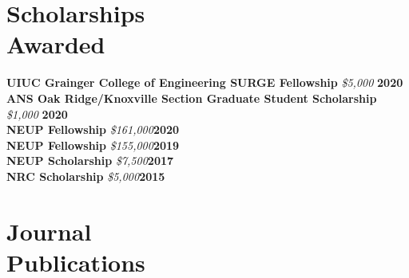 \documentclass[margin,line]{resume}
\begin{document}
\begin{resume}
    \section{\mysidestyle Scholarships\\Awarded}
    \textbf{UIUC Grainger College of Engineering SURGE Fellowship} \textsl{\$5,000} \hfill \textbf{2020}\\
    \textbf{ANS Oak Ridge/Knoxville Section Graduate Student Scholarship} \textsl{\$1,000} \hfill \textbf{2020}\\
    \textbf{NEUP Fellowship} \textsl{\$161,000}\hfill \textbf{2020}\\
    \textbf{NEUP Fellowship} \textsl{\$155,000}\hfill \textbf{2019}\\
    \textbf{NEUP Scholarship} \textsl{\$7,500}\hfill \textbf{2017}\\
    \textbf{NRC Scholarship} \textsl{\$5,000}\hfill \textbf{2015}\\

    \section{\mysidestyle Journal\\Publications}
      \begin{bibenum}
      \item {}
      \end{bibenum}


\end{resume}
\end{document}
